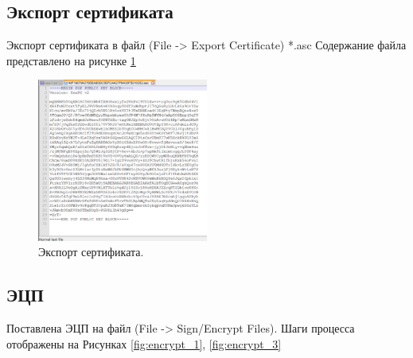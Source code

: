 \documentclass[10pt,a4paper]{article}
\begin{document}
\subsection{Экспорт сертификата}
\label{cert_export}

Экспорт сертификата в файл (File -> Export Certificate) *.asc
Содержание файла представлено на рисунке \ref{fig:cert_exported}

\begin{figure}[h]
\begin{center}
\includegraphics[width=0.5\textwidth]{cert_exported} %
\caption{Экспорт сертификата.}
\label{fig:cert_exported}
\end{center}
\end{figure}

\subsection{ЭЦП}
\label{echp}

Поставлена ЭЦП на файл (File -> Sign/Encrypt Files).
Шаги процесса отображены на Рисунках \ref{fig:encrypt_1}, \ref{fig:encrypt_3}
\end{document}
